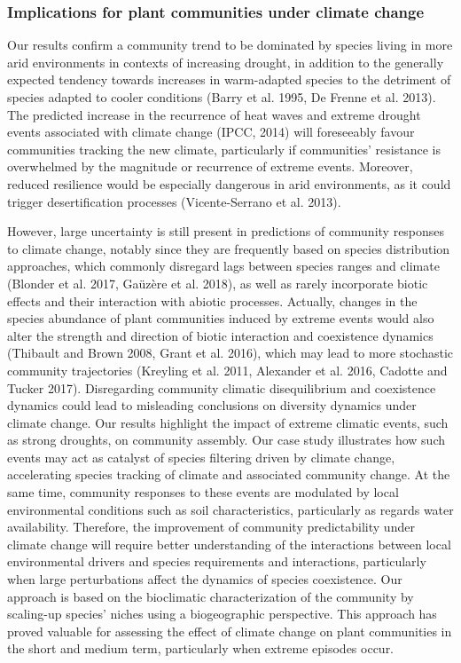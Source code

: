 \documentclass[11pt,twoside]{reedthesis}
\begin{document}
\subsubsection{Implications for plant communities under climate
change}\label{implications-for-plant-communities-under-climate-change}

Our results confirm a community trend to be dominated by species living
in more arid environments in contexts of increasing drought, in addition
to the generally expected tendency towards increases in warm-adapted
species to the detriment of species adapted to cooler conditions (Barry
et al. 1995, De Frenne et al. 2013). The predicted increase in the
recurrence of heat waves and extreme drought events associated with
climate change (IPCC, 2014) will foreseeably favour communities tracking
the new climate, particularly if communities' resistance is overwhelmed
by the magnitude or recurrence of extreme events. Moreover, reduced
resilience would be especially dangerous in arid environments, as it
could trigger desertification processes (Vicente-Serrano et al.
2013).\par

However, large uncertainty is still present in predictions of community
responses to climate change, notably since they are frequently based on
species distribution approaches, which commonly disregard lags between
species ranges and climate (Blonder et al. 2017, Gaüzère et al. 2018),
as well as rarely incorporate biotic effects and their interaction with
abiotic processes. Actually, changes in the species abundance of plant
communities induced by extreme events would also alter the strength and
direction of biotic interaction and coexistence dynamics (Thibault and
Brown 2008, Grant et al. 2016), which may lead to more stochastic
community trajectories (Kreyling et al. 2011, Alexander et al. 2016,
Cadotte and Tucker 2017). Disregarding community climatic disequilibrium
and coexistence dynamics could lead to misleading conclusions on
diversity dynamics under climate change. Our results highlight the
impact of extreme climatic events, such as strong droughts, on community
assembly. Our case study illustrates how such events may act as catalyst
of species filtering driven by climate change, accelerating species
tracking of climate and associated community change. At the same time,
community responses to these events are modulated by local environmental
conditions such as soil characteristics, particularly as regards water
availability. Therefore, the improvement of community predictability
under climate change will require better understanding of the
interactions between local environmental drivers and species
requirements and interactions, particularly when large perturbations
affect the dynamics of species coexistence. Our approach is based on the
bioclimatic characterization of the community by scaling-up species'
niches using a biogeographic perspective. This approach has proved
valuable for assessing the effect of climate change on plant communities
in the short and medium term, particularly when extreme episodes occur.
\end{document}
